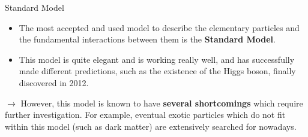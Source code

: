 \documentclass[handout,8 pt]{beamer}
\begin{document}
\begin{frame}{Standard Model}

   \begin{minipage}[c]{.49\linewidth}
   	\begin{itemize}
	\justifying
	\item The most accepted and used model to describe the elementary particles and the fundamental interactions between them is the \textbf{Standard Model}. \vfill \vspace{8pt}
	\item This model is quite elegant and is working really well, and has successfully made different predictions, such as the existence of the Higgs boson, finally discovered in 2012.\vfill
	\end{itemize}
   \end{minipage} \hfill
   \begin{minipage}[c]{.49\linewidth}
   \end{minipage} \hfill \vfill
     
	\justifying
	\begin{block}{}
	\justifying
	\vspace{5pt}
	$\rightarrow$ However, this model is known to have \textbf{several shortcomings} which require further investigation. For example, eventual exotic particles which do not fit within this model (such as dark matter) are extensively searched for nowadays. \vspace{5pt}
	\end{block} \vfill
	
\end{frame}
\end{document}
